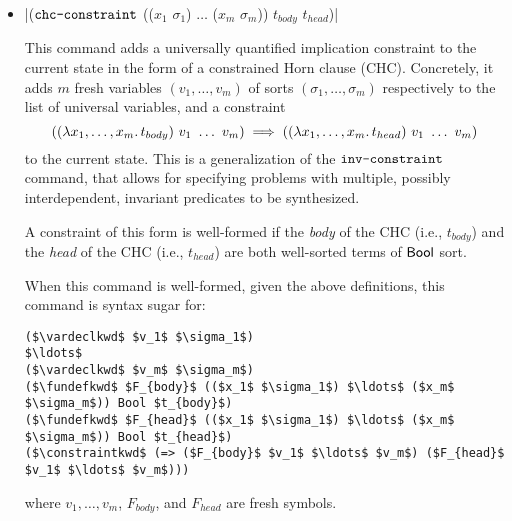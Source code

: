 \documentclass[english,a4paper,10pt]{article}
\begin{document}
\begin{itemize}
When this command is well-formed, given the above definitions,
this command is syntax sugar for:
\begin{lstlisting}[language=SyGuS, numbers=none, basicstyle=\ttfamily\small]
($\vardeclkwd$ $v_1$ $\sigma_1$)
($\vardeclkwd$ $v'_1$ $\sigma_1$)
$\ldots$
($\vardeclkwd$ $v_n$ $\sigma_n$)
($\vardeclkwd$ $v'_n$ $\sigma_n$)
($\constraintkwd$ (=> ($S_{pre}$ $v_1$ $\ldots$ $v_n$) ($S$ $v_1$ $\ldots$ $v_n$)))
($\constraintkwd$ (=> (and ($S$ $v_1$ $\ldots$ $v_n$) ($S_{trans}$ $v_1$ $\ldots$ $v_n$ $v'_1$ $\ldots$ $v'_n$)) ($S$ $v'_1$ $\ldots$ $v'_n$)))
($\constraintkwd$ (=> ($S$ $v_1$ $\ldots$ $v_n$) ($S_{post}$ $v_1$ $\ldots$ $v_n$)))
\end{lstlisting}
where $v_1, v'_1, \ldots, v_n, v'_n$ are fresh symbols.

\item \code|($\texttt{chc-constraint}$ (($x_1$ $\sigma_1$) $\ldots$ ($x_m$ $\sigma_m$)) $t_{body}$ $t_{head}$)|

This command adds a universally quantified implication constraint to the current state
in the form of a constrained Horn clause (CHC).
Concretely, it adds $m$ fresh variables $(v_1, \ldots, v_m)$ of sorts $(\sigma_1, \ldots, \sigma_m)$ respectively
to the list of universal variables,
and a constraint
$$
  ((\lambda x_1,\ldots,x_m \ldotp t_{body})\ v_1\ \ldots\ v_m) \implies ((\lambda x_1,\ldots,x_m \ldotp t_{head})\ v_1\ \ldots\ v_m)
$$
to the current state.
This is a generalization of the $\texttt{inv-constraint}$ command,
that allows for specifying problems with multiple, possibly interdependent,
invariant predicates to be synthesized.

A constraint of this form is well-formed if
the \emph{body} of the CHC (i.e., $t_{body}$) and the \emph{head} of the CHC (i.e., $t_{head}$)
are both well-sorted terms of $\mathsf{Bool}$ sort.

When this command is well-formed, given the above definitions,
this command is syntax sugar for:
\begin{lstlisting}[language=SyGuS, numbers=none, basicstyle=\ttfamily\small]
($\vardeclkwd$ $v_1$ $\sigma_1$)
$\ldots$
($\vardeclkwd$ $v_m$ $\sigma_m$)
($\fundefkwd$ $F_{body}$ (($x_1$ $\sigma_1$) $\ldots$ ($x_m$ $\sigma_m$)) Bool $t_{body}$)
($\fundefkwd$ $F_{head}$ (($x_1$ $\sigma_1$) $\ldots$ ($x_m$ $\sigma_m$)) Bool $t_{head}$)
($\constraintkwd$ (=> ($F_{body}$ $v_1$ $\ldots$ $v_m$) ($F_{head}$ $v_1$ $\ldots$ $v_m$)))
\end{lstlisting}
where $v_1, \ldots, v_m$, $F_{body}$, and $F_{head}$ are fresh symbols.

\end{itemize}
\end{document}
